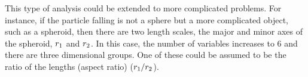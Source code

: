 \begin{solution}
This type of analysis could be extended to more complicated problems. For instance, if the particle falling is not a sphere but a more complicated object, such as a spheroid, then there are two length scales, the major and minor axes of the spheroid, $r_1$ and $r_2$. In this case, the number of variables increases to 6 and there are three dimensional groups. One of these could be assumed to be the ratio of the lengths (aspect ratio) ($r_1/r_2$).
\end{solution}

